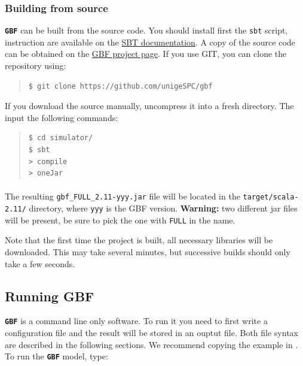 \documentclass[10pt,a4paper]{article}
\begin{document}
\subsubsection{Building from source}
\label{sec-2-2}

\textbf{\texttt{\textsf{\color{namecolor}GBF}}} can be built from the source code. You should install first the
\texttt{sbt} script, instruction are available on the \href{http://www.scala-sbt.org/0.13/tutorial/Manual-Installation.html}{SBT documentation}. A copy of the source code can be obtained on the \href{http://example}{GBF project page}. If
you use GIT, you can clone the repository using:

\begin{quote}
\begin{verbatim}
$ git clone https://github.com/unigeSPC/gbf
\end{verbatim}
\end{quote}

If you download the source manually, uncompress it into a fresh directory. The
input the following commands:

\begin{quote}
\begin{verbatim}
$ cd simulator/
$ sbt
> compile
> oneJar
\end{verbatim}
\end{quote}

\paragraph{} The resulting \verb+gbf_FULL_2.11-yyy.jar+ file will be located in the \texttt{target/scala-2.11/}
directory, where \texttt{yyy} is the GBF version. \textbf{Warning:}
two different jar files will be present, be sure to pick the one with
\texttt{FULL} in the name.

Note that the first
time the project is built, all necessary libraries will be
downloaded. This may take several minutes, but successive builds should only
take a few seconds.

\subsection{Running GBF}
\label{sec-3}

\textbf{\texttt{\textsf{\color{namecolor}GBF}}} is a command line only software. To run it you need to first write
a configuration file and the result will be stored in an ouptut file.
Both file syntax are described in the following sections. We recommend
copying the example in . To run the \textbf{\texttt{\textsf{\color{namecolor}GBF}}} model, type:
\end{document}
